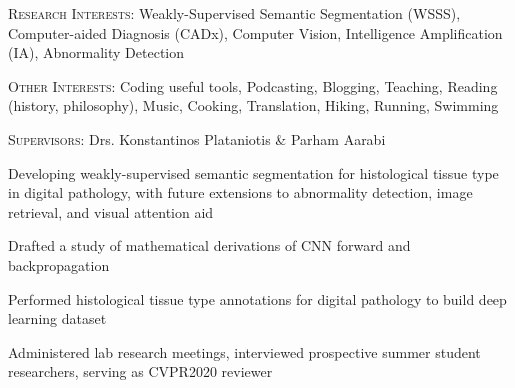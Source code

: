\documentclass[12pt]{cv_style}
\begin{document}
\begin{ditem}
	\item \textsc{Research Interests:} Weakly-Supervised Semantic Segmentation (WSSS), Computer-aided Diagnosis (CADx), Computer Vision, Intelligence Amplification (IA), Abnormality Detection
	\item \textsc{Other Interests:} Coding useful tools, Podcasting, Blogging, Teaching, Reading (history, philosophy), Music, Cooking, Translation, Hiking, Running, Swimming
\end{ditem}

\newpage
\textsc{Supervisors:} Drs. Konstantinos Plataniotis \& Parham Aarabi
\begin{ditem}
	\item Developing weakly-supervised semantic segmentation for histological tissue type in digital pathology, with future extensions to abnormality detection, image retrieval, and visual attention aid
	\item Drafted a study of mathematical derivations of CNN forward and backpropagation
	\item Performed histological tissue type annotations for digital pathology to build deep learning dataset
	\item Administered lab research meetings, interviewed prospective summer student researchers, serving as CVPR2020 reviewer
\end{ditem}
\end{document}
